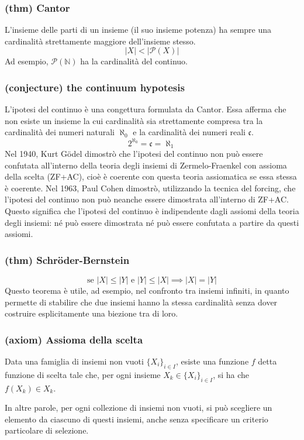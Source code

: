 \subsubsection{(thm) Cantor}
L'insieme delle parti di un insieme (il suo insieme potenza) ha sempre una cardinalità strettamente maggiore dell'insieme stesso.
$$|X|<|\mathcal P(X)|$$
Ad esempio, $\mathcal P(\mathbb N)$ ha la cardinalità del continuo.
\subsubsection{(conjecture) the continuum hypotesis}
L'ipotesi del continuo è una congettura formulata da Cantor. Essa afferma che non esiste un insieme la cui cardinalità sia strettamente compresa tra la cardinalità dei numeri naturali $\aleph_0$ e la cardinalità dei numeri reali $\mathfrak c$.
$$2^{\aleph_0}=\mathfrak c = \aleph_1$$
Nel 1940, Kurt Gödel dimostrò che l'ipotesi del continuo non può essere confutata all'interno della teoria degli insiemi di Zermelo-Fraenkel con assioma della scelta (ZF+AC), cioè è coerente con questa teoria assiomatica se essa stessa è coerente. Nel 1963, Paul Cohen dimostrò, utilizzando la tecnica del forcing, che l'ipotesi del continuo non può neanche essere dimostrata all'interno di ZF+AC. Questo significa che l'ipotesi del continuo è indipendente dagli assiomi della teoria degli insiemi: né può essere dimostrata né può essere confutata a partire da questi assiomi.
\subsubsection{(thm) Schröder-Bernstein}
$$\text{se }|X|\le |Y| \text{ e }|Y|\le |X|\implies |X|=|Y|$$
Questo teorema è utile, ad esempio, nel confronto tra insiemi infiniti, in quanto permette di stabilire che due insiemi hanno la stessa cardinalità senza dover costruire esplicitamente una biezione tra di loro.
\subsubsection{(axiom) Assioma della scelta}
Data una famiglia di insiemi non vuoti $\{X_i\}_{i\in I}$, esiste una funzione $f$ detta funzione di scelta tale che, per ogni insieme $X_k\in \{X_i\}_{i\in I}$, si ha che $f(X_k)\in X_k$.

In altre parole, per ogni collezione di insiemi non vuoti, si può scegliere un elemento da ciascuno di questi insiemi, anche senza specificare un criterio particolare di selezione.

